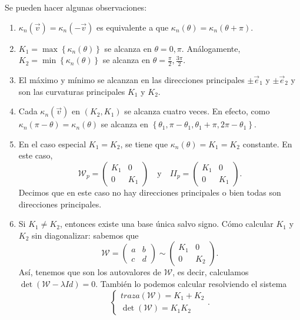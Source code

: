 \begin{observation} Se pueden hacer algunas observaciones:
\begin{enumerate}
\item $\displaystyle \kappa_{n}\left(\vec{v}\right)=\kappa_{n}\left(-\vec{v}\right) $ es equivalente a que $\displaystyle \kappa_{n}\left(\theta \right) = \kappa_{n}\left(\theta + \pi \right) $. 
\item $\displaystyle K_{1}= \max \left\{ \kappa_{n}\left(\theta \right)\right\}  $ se alcanza en $\displaystyle \theta = 0, \pi  $. Análogamente, $\displaystyle K_{2}=\min \left\{ \kappa_{n}\left(\theta\right)\right\}  $ se alcanza en $\displaystyle \theta = \frac{\pi }{2}, \frac{3\pi }{2} $. 
\item El máximo y mínimo se alcanzan en las direcciones principales $\displaystyle \pm\vec{e}_{1} $ y $\displaystyle \pm\vec{e}_{2} $ y son las curvaturas principales $\displaystyle K_{1} $ y $\displaystyle K_{2} $. 
\item Cada $\displaystyle \kappa_{n}\left(\vec{v}\right) $ en $\displaystyle \left(K_{2}, K_{1}\right) $ se alcanza cuatro veces. En efecto, como $\displaystyle \kappa_{n}\left(\pi -\theta \right)=\kappa_{n}\left(\theta \right) $ se alcanza en $\displaystyle \left\{ \theta_{1}, \pi - \theta_{1}, \theta_{1}+\pi , 2\pi -\theta_{1}\right\}  $. 
\item En el caso especial $\displaystyle K_{1} = K_{2} $, se tiene que $\displaystyle \kappa_{n}\left(\theta \right)=K_{1} = K_{2} $ constante. En este caso, 
	\[\mathcal{W}_{p}=\begin{pmatrix} K_{1} & 0 \\ 0 & K_{1} \end{pmatrix}\quad \text{y} \quad II_{p} = \begin{pmatrix} K_{1} & 0 \\ 0 & K_{1} \end{pmatrix} .\]
	Decimos que en este caso no hay direcciones principales o bien todas son direcciones principales. 
\item Si $\displaystyle K_{1}\neq K_{2} $, entonces existe una base única salvo signo. Cómo calcular $\displaystyle K_{1} $ y $\displaystyle K_{2} $ sin diagonalizar: sabemos que
	\[\mathcal{W}=\begin{pmatrix} a & b \\ c & d \end{pmatrix}\sim \begin{pmatrix} K_{1} & 0 \\ 0 & K_{2} \end{pmatrix} .\]
	Así, tenemos que son los autovalores de $\displaystyle \mathcal{W} $, es decir, calculamos $\displaystyle \det\left(\mathcal{W}-\lambda Id\right)=0 $. También lo podemos calcular resolviendo el sistema
	\[
	\begin{cases}
	traza\left(\mathcal{W}\right)=K_{1}+K_{2} \\
	\det\left(\mathcal{W}\right)=K_{1}K_{2}
	\end{cases}
	.\]
\end{enumerate}
\end{observation}

